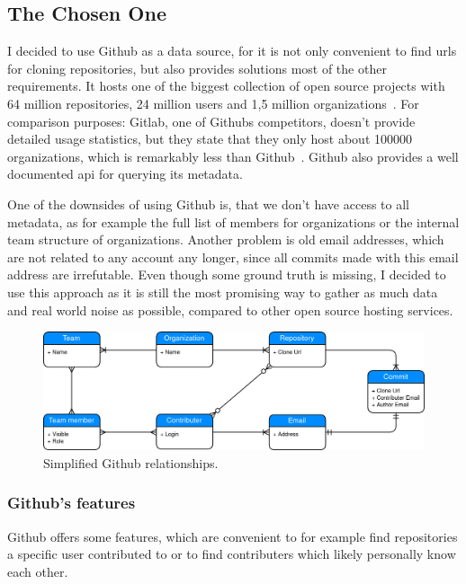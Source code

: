 \subsection{The Chosen One}
I decided to use Github as a data source, for it is not only convenient to find \acp{url} for cloning repositories, but also provides solutions most of the other requirements.
It hosts one of the biggest collection of open source projects with 64 million repositories, 24 million users and 1,5 million organizations~\cite{article:github-statistics}.
For comparison purposes: Gitlab, one of Githubs competitors, doesn't provide detailed usage statistics, but they state that they only host about 100000 organizations, which is remarkably less than Github~\cite{article:gitlab-help}.
Github also provides a well documented \ac{api} for querying its metadata.

One of the downsides of using Github is, that we don't have access to all metadata, as for example the full list of members for organizations or the internal team structure of organizations.
Another problem is old email addresses, which are not related to any account any longer, since all commits made with this email address are irrefutable.
Even though some ground truth is missing, I decided to use this approach as it is still the most promising way to gather as much data and real world noise as possible, compared to other open source hosting services.

\begin{figure}[H]
\includegraphics[scale=0.27]{./graphs/github-data-structure}
\centering
\caption{Simplified Github relationships.}\label{fig:github-relationship}
\end{figure}

\subsubsection{Github's features}
Github offers some features, which are convenient to for example find repositories a specific user contributed to or to find contributers which likely personally know each other.

